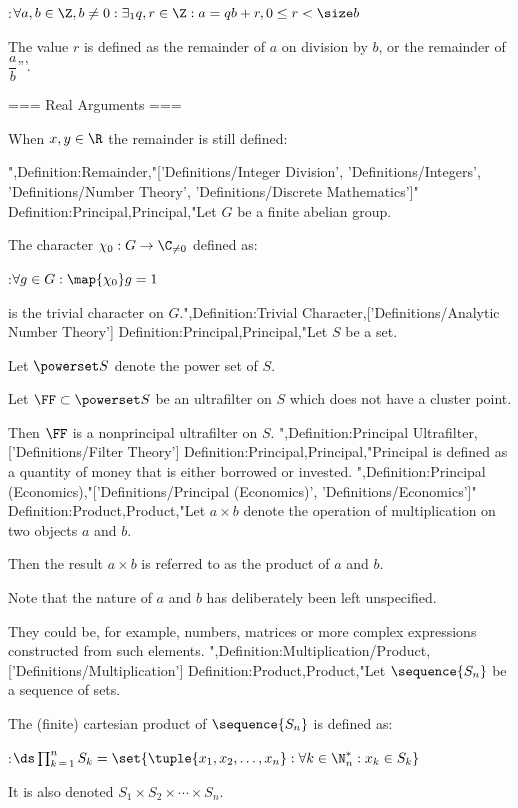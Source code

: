 :$\forall a, b \in \Z, b \ne 0: \exists_1 q, r \in \Z: a = q b + r, 0 \le r < \size b$


The value $r$ is defined as the remainder of $a$ on division by $b$, or the remainder of $\dfrac a b$'''.


=== Real Arguments ===

When $x, y \in \R$ the remainder is still defined:

",Definition:Remainder,"['Definitions/Integer Division', 'Definitions/Integers', 'Definitions/Number Theory', 'Definitions/Discrete Mathematics']"
Definition:Principal,Principal,"Let $G$ be a finite abelian group.

The character $\chi_0: G \to \C_{\ne 0}$ defined as:

:$\forall g \in G: \map {\chi_0} g = 1$

is the trivial character on $G$.",Definition:Trivial Character,['Definitions/Analytic Number Theory']
Definition:Principal,Principal,"Let $S$ be a set.

Let $\powerset S$ denote the power set of $S$.


Let $\FF \subset \powerset S$ be an ultrafilter on $S$ which does not have a cluster point.

Then $\FF$ is a nonprincipal ultrafilter  on $S$.
",Definition:Principal Ultrafilter,['Definitions/Filter Theory']
Definition:Principal,Principal,"Principal is defined as a quantity of money that is either borrowed or invested.
",Definition:Principal (Economics),"['Definitions/Principal (Economics)', 'Definitions/Economics']"
Definition:Product,Product,"Let $a \times b$ denote the operation of multiplication on two objects $a$ and $b$.

Then the result $a \times b$ is referred to as the product of $a$ and $b$.


Note that the nature of $a$ and $b$ has deliberately been left unspecified.

They could be, for example, numbers, matrices or more complex expressions constructed from such elements.
",Definition:Multiplication/Product,['Definitions/Multiplication']
Definition:Product,Product,"Let $\sequence {S_n}$ be a sequence of sets. 

The (finite) cartesian product of $\sequence {S_n}$ is defined as:

:$\ds \prod_{k \mathop = 1}^n S_k = \set {\tuple {x_1, x_2, \ldots, x_n}: \forall k \in \N^*_n: x_k \in S_k}$


It is also denoted $S_1 \times S_2 \times \cdots \times S_n$.

